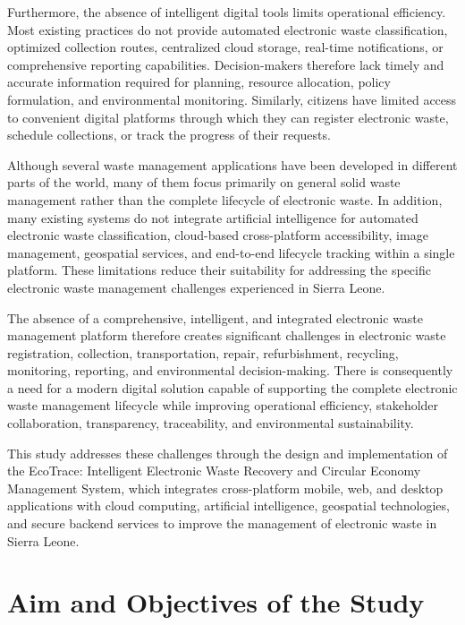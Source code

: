 Furthermore, the absence of intelligent digital tools limits operational efficiency.
Most existing practices do not provide automated electronic waste classification,
optimized collection routes, centralized cloud storage, real-time notifications, or
comprehensive reporting capabilities. Decision-makers therefore lack timely and
accurate information required for planning, resource allocation, policy formulation,
and environmental monitoring. Similarly, citizens have limited access to convenient
digital platforms through which they can register electronic waste, schedule
collections, or track the progress of their requests.

Although several waste management applications have been developed in
different parts of the world, many of them focus primarily on general solid waste
management rather than the complete lifecycle of electronic waste. In addition, many
existing systems do not integrate artificial intelligence for automated electronic waste
classification, cloud-based cross-platform accessibility, image management,
geospatial services, and end-to-end lifecycle tracking within a single platform. These
limitations reduce their suitability for addressing the specific electronic waste
management challenges experienced in Sierra Leone.

The absence of a comprehensive, intelligent, and integrated electronic waste
management platform therefore creates significant challenges in electronic waste
registration, collection, transportation, repair, refurbishment, recycling, monitoring,
reporting, and environmental decision-making. There is consequently a need for a
modern digital solution capable of supporting the complete electronic waste
management lifecycle while improving operational efficiency, stakeholder
collaboration, transparency, traceability, and environmental sustainability.

This study addresses these challenges through the design and implementation of
the EcoTrace: Intelligent Electronic Waste Recovery and Circular Economy
Management System, which integrates cross-platform mobile, web, and desktop
applications with cloud computing, artificial intelligence, geospatial technologies, and
secure backend services to improve the management of electronic waste in Sierra
Leone.

\section{Aim and Objectives of the Study}
\label{sec:aim-objectives}

